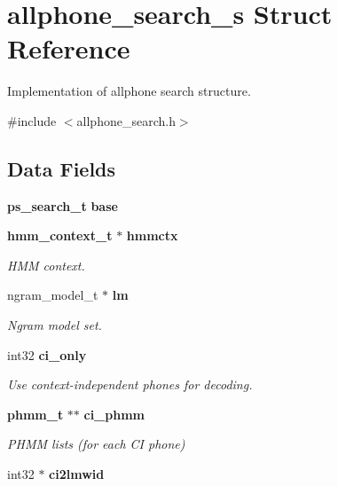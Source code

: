 \section{allphone\+\_\+search\+\_\+s Struct Reference}
\label{structallphone__search__s}


Implementation of allphone search structure.  




{\ttfamily \#include $<$allphone\+\_\+search.\+h$>$}

\subsection*{Data Fields}
\begin{DoxyCompactItemize}
\item 
{\bf ps\+\_\+search\+\_\+t} {\bfseries base}\label{structallphone__search__s_aed4067ba47369dcbb84633cb436c209a}

\item 
{\bf hmm\+\_\+context\+\_\+t} $\ast$ {\bf hmmctx}
\begin{DoxyCompactList}\small\item\em H\+M\+M context. \end{DoxyCompactList}\item 
ngram\+\_\+model\+\_\+t $\ast$ {\bf lm}\label{structallphone__search__s_ac1220a564a57a418312800df44bd95ca}

\begin{DoxyCompactList}\small\item\em Ngram model set. \end{DoxyCompactList}\item 
int32 {\bf ci\+\_\+only}\label{structallphone__search__s_ab4d9470249d15abca8e9fd01f1d437a7}

\begin{DoxyCompactList}\small\item\em Use context-\/independent phones for decoding. \end{DoxyCompactList}\item 
{\bf phmm\+\_\+t} $\ast$$\ast$ {\bf ci\+\_\+phmm}\label{structallphone__search__s_a2646c8ad402da8a644ecebd28386de0d}

\begin{DoxyCompactList}\small\item\em P\+H\+M\+M lists (for each C\+I phone) \end{DoxyCompactList}\item 
int32 $\ast$ {\bf ci2lmwid}\label{structallphone__search__s_a9021eb4d9645cc3138535dfad8272601}


\end{DoxyCompactItemize}
